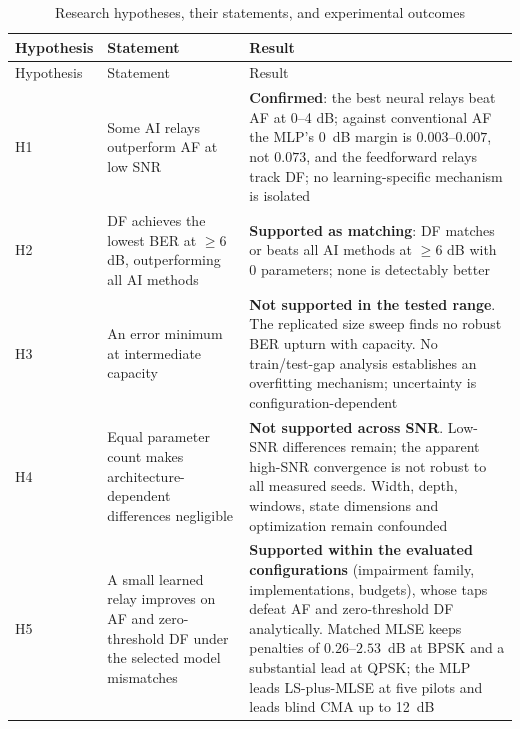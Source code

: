\begin{longtable}[]{@{}
  >{\raggedright\arraybackslash}p{}
  >{\raggedright\arraybackslash}p{}
  >{\raggedright\arraybackslash}p{}@{}}
\caption[Hypothesis outcomes summary]{Research hypotheses, their statements, and experimental outcomes}\label{tbl:table33}\tabularnewline
\toprule\noalign{}
\begin{minipage}[b]{\linewidth}\raggedright
Hypothesis
\end{minipage} & \begin{minipage}[b]{\linewidth}\raggedright
Statement
\end{minipage} & \begin{minipage}[b]{\linewidth}\raggedright
Result
\end{minipage} \\
\midrule\noalign{}
\endfirsthead
\toprule\noalign{}
\begin{minipage}[b]{\linewidth}\raggedright
Hypothesis
\end{minipage} & \begin{minipage}[b]{\linewidth}\raggedright
Statement
\end{minipage} & \begin{minipage}[b]{\linewidth}\raggedright
Result
\end{minipage} \\
\midrule\noalign{}
\endhead
\bottomrule\noalign{}
\endlastfoot
H1 & Some AI relays outperform AF at low SNR & \textbf{Confirmed}: the best neural relays beat AF at 0--4 dB; against conventional AF the MLP's 0~dB margin is $0.003$--$0.007$, not $0.073$, and the feedforward relays track DF; no learning-specific mechanism is isolated \\
H2 & DF achieves the lowest BER at \(\geq 6\) dB, outperforming all AI methods & \textbf{Supported as matching}: DF matches or beats all AI methods at \(\geq 6\) dB with 0 parameters; none is detectably better \\
H3 & An error minimum at intermediate capacity & \textbf{Not supported in the tested range}. The replicated size sweep finds no robust BER upturn with capacity. No train/test-gap analysis establishes an overfitting mechanism; uncertainty is configuration-dependent \\
H4 & Equal parameter count makes architecture-dependent differences negligible & \textbf{Not supported across SNR}. Low-SNR differences remain; the apparent high-SNR convergence is not robust to all measured seeds. Width, depth, windows, state dimensions and optimization remain confounded \\
H5 & A small learned relay improves on AF and zero-threshold DF under the selected model mismatches & \textbf{Supported within the evaluated configurations} (impairment family, implementations, budgets), whose taps defeat AF and zero-threshold DF analytically. Matched MLSE keeps penalties of $0.26$--$2.53$~dB at BPSK and a substantial lead at QPSK; the MLP leads LS-plus-MLSE at five pilots and leads blind CMA up to 12~dB \\
\end{longtable}


